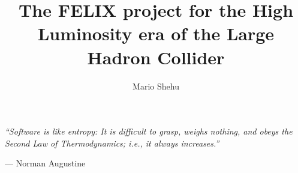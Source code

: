 \documentclass{styles/tthesis}
\title{The FELIX project for the High Luminosity era of the Large Hadron Collider}
\author{Mario Shehu}
\begin{document}


\printfrontpage




\chapter*{\mbox{}}

\begin{flushright}
\thispagestyle{empty}
\null{}
{\it “Software is like entropy: It is difficult to grasp, weighs nothing, and obeys the Second Law of Thermodynamics; i.e., it always increases.”

\vspace{10pt}
— Norman Augustine
}
\null
\end{flushright}
%
\thispagestyle{empty}
\mbox{}
\newpage





\tableofcontents
\listoffigures
\listoftables

\mainmatter

% 
% 
% 
% 
% 
% 
% 










\appendix



\printbibliography
\end{document}
